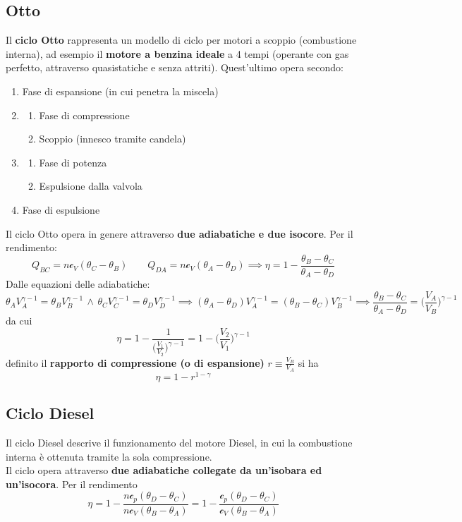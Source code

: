 \documentclass[10pt, oneside]{book}
\newcommand{\ds}{\displaystyle}
\newcommand{\molhtv}{\mathcal{c}_V }
\newcommand{\molhtp}{\mathcal{c}_p }
\begin{document}
\subsection{Otto}
Il \textbf{ciclo Otto} rappresenta un modello di ciclo per motori a scoppio (combustione interna), ad esempio il \textbf{motore a benzina ideale} a 4 tempi (operante con gas perfetto, attraverso quasistatiche e senza attriti). Quest'ultimo opera secondo:
\begin{enumerate}
\item Fase di espansione (in cui penetra la miscela)
\item \begin{enumerate}
\item Fase di compressione
\item Scoppio (innesco tramite candela)
\end{enumerate}
\item \begin{enumerate}
\item Fase di potenza
\item Espulsione dalla valvola
\end{enumerate}
\item Fase di espulsione
\end{enumerate}
Il ciclo Otto opera in genere attraverso \textbf{due adiabatiche e due isocore}. Per il rendimento:
\[Q_{BC} = n \molhtv (\theta_C - \theta_B) \qquad Q_{DA} = n \molhtv (\theta_A - \theta_D) \implies \eta = 1 - \frac{\theta_B - \theta_C}{\theta_A - \theta_D}\]
Dalle equazioni delle adiabatiche:
\[\theta_A V_A^{\gamma - 1} = \theta_B V_B^{\gamma - 1} \, \land \, \theta_C V_C^{\gamma - 1} = \theta_D V_D^{\gamma - 1} \implies (\theta_A - \theta_D) V_A^{\gamma - 1} = (\theta_B - \theta_C) V_B^{\gamma - 1} \implies \frac{\theta_B - \theta_C}{\theta_A - \theta_D} = \bigg(\frac{V_A}{V_B}\bigg)^{\gamma - 1}\]
da cui
\[\eta = 1 - \frac{1}{\bigg(\displaystyle \frac{V_1}{V_2}\bigg)^{\gamma -1}} = 1 - \bigg(\displaystyle \frac{V_2}{V_1}\bigg)^{\gamma -1}\]
definito il \textbf{rapporto di compressione (o di espansione)} $\ds r \equiv \frac{V_B}{V_A}$ si ha
\[\eta = 1 - r^{1 - \gamma}\]

\subsection{Ciclo Diesel}
Il ciclo Diesel descrive il funzionamento del motore Diesel, in cui la combustione interna è ottenuta tramite la sola compressione.\\
Il ciclo opera attraverso \textbf{due adiabatiche collegate da un'isobara ed un'isocora}. Per il rendimento
\[\eta = 1 - \frac{n \molhtp (\theta_D - \theta_C)}{n \molhtv (\theta_B - \theta_A)} = 1 - \frac{\molhtp (\theta_D - \theta_C)}{\molhtv (\theta_B - \theta_A)}\]
\end{document}

